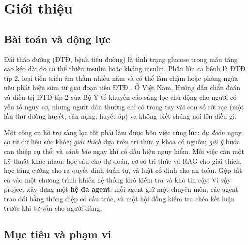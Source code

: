 \chapter{Giới thiệu}
\label{chap:intro}

\section{Bài toán và động lực}

Đái tháo đường (ĐTĐ, bệnh tiểu đường) là tình trạng glucose trong máu tăng cao kéo dài do cơ thể thiếu insulin hoặc kháng insulin. Phần lớn ca bệnh là ĐTĐ típ 2, loại tiến triển âm thầm nhiều năm và có thể làm chậm hoặc phòng ngừa nếu phát hiện sớm từ giai đoạn tiền ĐTĐ \cite{ada2024,knowler2002dpp}. Ở Việt Nam, Hướng dẫn chẩn đoán và điều trị ĐTĐ típ 2 của Bộ Y tế \cite{byt5481} khuyến cáo sàng lọc chủ động cho người có yếu tố nguy cơ, nhưng người dân thường chỉ có trong tay vài con số rời rạc (một lần thử đường huyết, cân nặng, huyết áp) và không biết chúng nói lên điều gì.

Một công cụ hỗ trợ sàng lọc tốt phải làm được bốn việc cùng lúc: \emph{dự đoán} nguy cơ từ dữ liệu sức khỏe; \emph{giải thích} dựa trên tri thức y khoa có nguồn; \emph{gợi ý} bước can thiệp cụ thể; và \emph{cảnh báo} ngay khi có dấu hiệu nguy hiểm. Mỗi việc cần một kỹ thuật khác nhau: học sâu cho dự đoán, cơ sở tri thức và RAG cho giải thích, học tăng cường cho ra quyết định tuần tự, và luật cố định cho an toàn. Gộp tất cả vào một chương trình khiến hệ thống khó kiểm tra và khó tin cậy. Vì vậy project xây dựng một \textbf{hệ đa agent}: mỗi agent giữ một chuyên môn, các agent trao đổi bằng thông điệp có cấu trúc, và một hội đồng kiểm tra chéo kết luận trước khi tư vấn cho người dùng.

\section{Mục tiêu và phạm vi}

